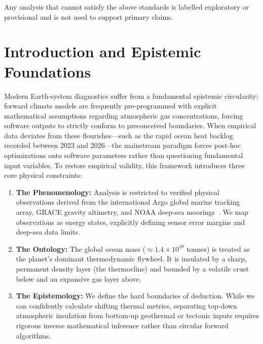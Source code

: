 \documentclass[11pt,a4paper]{article}
\begin{document}
Any analysis that cannot satisfy the above standards is labelled exploratory or provisional and is not used to support primary claims.
\section{Introduction and Epistemic Foundations}
Modern Earth-system diagnostics suffer from a fundamental epistemic circularity: forward climate models are frequently pre-programmed with explicit mathematical assumptions regarding atmospheric gas concentrations, forcing software outputs to strictly conform to preconceived boundaries. When empirical data deviates from these flourishes---such as the rapid ocean heat backlog recorded between 2023 and 2026---the mainstream paradigm forces post-hoc optimizations onto software parameters rather than questioning fundamental input variables. To restore empirical validity, this framework introduces three core physical constraints:
\begin{enumerate}
    \item \textbf{The Phenomenology:} Analysis is restricted to verified physical observations derived from the international Argo global marine tracking array, GRACE gravity altimetry, and NOAA deep-sea moorings~\cite{argoteam2023}. We map observations as energy states, explicitly defining sensor error margins and deep-sea data limits.
    \item \textbf{The Ontology:} The global ocean mass ($\approx 1.4 \times 10^{18}$ tonnes) is treated as the planet's dominant thermodynamic flywheel. It is insulated by a sharp, permanent density layer (the thermocline) and bounded by a volatile crust below and an expansive gas layer above.
    \item \textbf{The Epistemology:} We define the hard boundaries of deduction. While we can confidently calculate shifting thermal metrics, separating top-down atmospheric insulation from bottom-up geothermal or tectonic inputs requires rigorous inverse mathematical inference rather than circular forward algorithms.
\end{enumerate}
\end{document}

